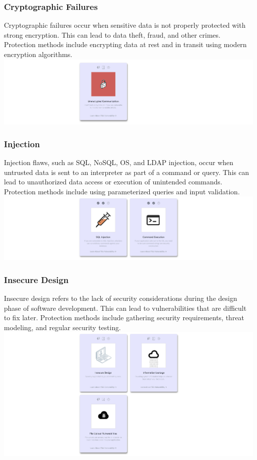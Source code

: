 \documentclass[12pt]{article}
\begin{document}
\subsubsection{Cryptographic Failures}
Cryptographic failures occur when sensitive data is not properly protected with strong encryption. This can lead to data theft, fraud, and other crimes. Protection methods include encrypting data at rest and in transit using modern encryption algorithms.
\includegraphics[width=1\textwidth]{Image7.png}

\subsubsection{Injection}
Injection flaws, such as SQL, NoSQL, OS, and LDAP injection, occur when untrusted data is sent to an interpreter as part of a command or query. This can lead to unauthorized data access or execution of unintended commands. Protection methods include using parameterized queries and input validation. \\
\includegraphics[width=1\textwidth]{Image8.png}

\subsubsection{Insecure Design}
Insecure design refers to the lack of security considerations during the design phase of software development. This can lead to vulnerabilities that are difficult to fix later. Protection methods include gathering security requirements, threat modeling, and regular security testing. \\
\includegraphics[width=1\textwidth]{Image9.png}
\end{document}
